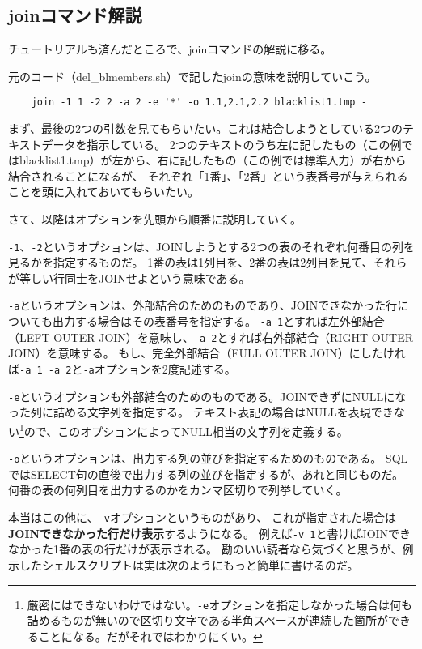 \subsection*{joinコマンド解説}

チュートリアルも済んだところで、joinコマンドの解説に移る。

元のコード（del\_{}blmembers.sh）で記したjoinの意味を説明していこう。
\begin{verbatim}
	join -1 1 -2 2 -a 2 -e '*' -o 1.1,2.1,2.2 blacklist1.tmp -
\end{verbatim}

まず、最後の2つの引数を見てもらいたい。これは結合しようとしている2つのテキストデータを指示している。
2つのテキストのうち左に記したもの（この例ではblacklist1.tmp）が左から、右に記したもの（この例では標準入力）が右から結合されることになるが、
それぞれ「1番」、「2番」という表番号が与えられることを頭に入れておいてもらいたい。

さて、以降はオプションを先頭から順番に説明していく。

\verb|-1|、\verb|-2|というオプションは、JOINしようとする2つの表のそれぞれ何番目の列を見るかを指定するものだ。
1番の表は1列目を、2番の表は2列目を見て、それらが等しい行同士をJOINせよという意味である。

\verb|-a|というオプションは、外部結合のためのものであり、JOINできなかった行についても出力する場合はその表番号を指定する。
\verb|-a 1|とすれば左外部結合（LEFT OUTER JOIN）を意味し、\verb|-a 2|とすれば右外部結合（RIGHT OUTER JOIN）を意味する。
もし、完全外部結合（FULL OUTER JOIN）にしたければ\verb|-a 1 -a 2|と\verb|-a|オプションを2度記述する。

\verb|-e|というオプションも外部結合のためのものである。JOINできずにNULLになった列に詰める文字列を指定する。
テキスト表記の場合はNULLを表現できない\footnote{厳密にはできないわけではない。\verb|-e|オプションを指定しなかった場合は何も詰めるものが無いので区切り文字である半角スペースが連続した箇所ができることになる。だがそれではわかりにくい。}ので、このオプションによってNULL相当の文字列を定義する。

\verb|-o|というオプションは、出力する列の並びを指定するためのものである。
SQLではSELECT句の直後で出力する列の並びを指定するが、あれと同じものだ。
何番の表の何列目を出力するのかをカンマ区切りで列挙していく。

本当はこの他に、\verb|-v|オプションというものがあり、
これが指定された場合は\textbf{JOINできなかった行だけ表示}するようになる。
例えば\verb|-v 1|と書けばJOINできなかった1番の表の行だけが表示される。
勘のいい読者なら気づくと思うが、例示したシェルスクリプトは実は次のようにもっと簡単に書けるのだ。

